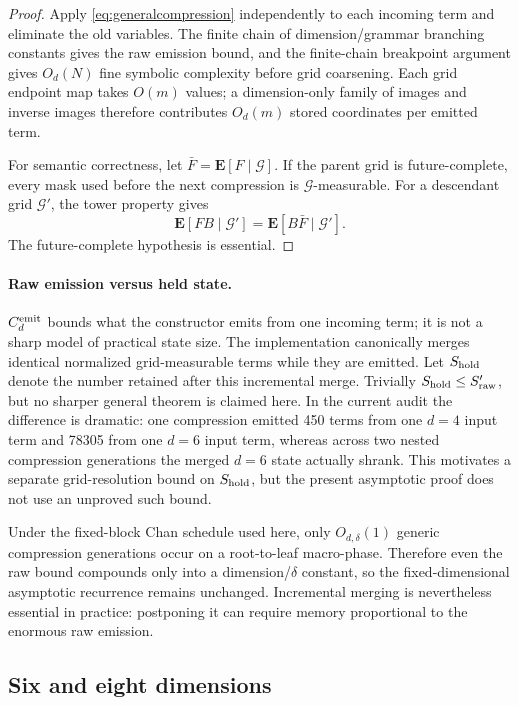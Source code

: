 \documentclass[12pt,a4paper]{article}
\theoremstyle{definition}
\newcommand{\1}{\mathbf 1}
\begin{document}
\begin{proof}
Apply \eqref{eq:generalcompression} independently to each incoming term and eliminate the old variables. The finite chain of dimension/grammar branching constants gives the raw emission bound, and the finite-chain breakpoint argument gives $O_d(N)$ fine symbolic complexity before grid coarsening. Each grid endpoint map takes $O(m)$ values; a dimension-only family of images and inverse images therefore contributes $O_d(m)$ stored coordinates per emitted term.

For semantic correctness, let $\bar F=\mathbf E[F\mid\mathcal G]$. If the parent grid is future-complete, every mask used before the next compression is $\mathcal G$-measurable. For a descendant grid $\mathcal G'$, the tower property gives
\[
\mathbf E[FB\mid\mathcal G']=\mathbf E[B\bar F\mid\mathcal G'].
\]
The future-complete hypothesis is essential.
\end{proof}

\paragraph{Raw emission versus held state.}
$C_d^{\rm emit}$ bounds what the constructor emits from one incoming term; it is not a sharp model of practical state size. The implementation canonically merges identical normalized grid-measurable terms while they are emitted. Let $S_{\rm hold}$ denote the number retained after this incremental merge. Trivially $S_{\rm hold}\le S_{\rm raw}'$, but no sharper general theorem is claimed here. In the current audit the difference is dramatic: one compression emitted 450 terms from one $d=4$ input term and 78305 from one $d=6$ input term, whereas across two nested compression generations the merged $d=6$ state actually shrank. This motivates a separate grid-resolution bound on $S_{\rm hold}$, but the present asymptotic proof does not use an unproved such bound.

Under the fixed-block Chan schedule used here, only $O_{d,\delta}(1)$ generic compression generations occur on a root-to-leaf macro-phase. Therefore even the raw bound compounds only into a dimension/$\delta$ constant, so the fixed-dimensional asymptotic recurrence remains unchanged. Incremental merging is nevertheless essential in practice: postponing it can require memory proportional to the enormous raw emission.

\subsection{Six and eight dimensions}
\end{document}
